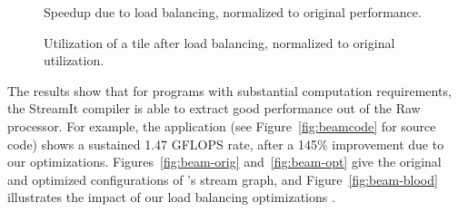 \begin{figure}
\begin{minipage}{3.2in}
\centering
{}
\caption{Speedup due to load balancing, normalized to original performance.
\protect\label{fig:opt-diagram}}
\end{minipage}
\hspace{0.1in}
\begin{minipage}{3.2in}
\centering
{}
\caption{Utilization of a tile after load balancing, normalized to original utilization.\protect\label{fig:utilization-diagram}}
\end{minipage}
\end{figure}

The results show that for programs with substantial computation
requirements, the StreamIt compiler is able to extract good
performance out of the Raw processor.  For example, the \Radar
application (see Figure~\ref{fig:beamcode} for source code) shows a
sustained 1.47 GFLOPS rate, after a 145\% improvement due to our
optimizations.  Figures~\ref{fig:beam-orig} and~\ref{fig:beam-opt}
give the original and optimized configurations of \Radar's stream
graph, and Figure~\ref{fig:beam-blood} illustrates the impact of our
load balancing optimizations .
%
